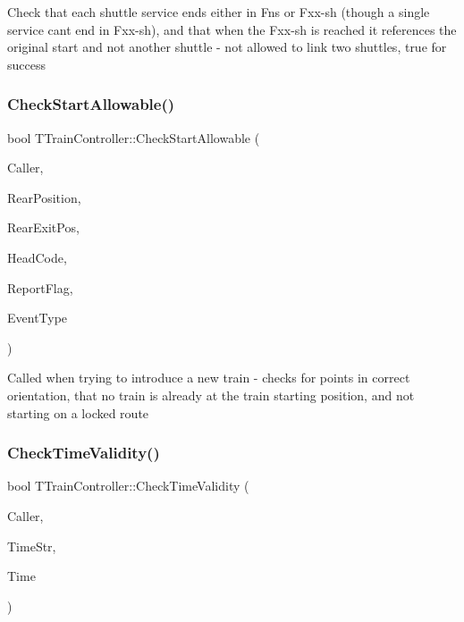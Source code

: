 Check that each shuttle service ends either in Fns or Fxx-\/sh (though a single service can\textquotesingle{}t end in Fxx-\/sh), and that when the Fxx-\/sh is reached it references the original start and not another shuttle -\/ not allowed to link two shuttles, true for success \mbox{\label{class_t_train_controller_ab8d8cf015d4784f12585f0ead325e9bf}} 
\subsubsection{\texorpdfstring{Check\+Start\+Allowable()}{CheckStartAllowable()}}
{\footnotesize\ttfamily bool T\+Train\+Controller\+::\+Check\+Start\+Allowable (\begin{DoxyParamCaption}\item[{int}]{Caller,  }\item[{int}]{Rear\+Position,  }\item[{int}]{Rear\+Exit\+Pos,  }\item[{Ansi\+String}]{Head\+Code,  }\item[{bool}]{Report\+Flag,  }\item[{T\+Action\+Event\+Type \&}]{Event\+Type }\end{DoxyParamCaption})}

Called when trying to introduce a new train -\/ checks for points in correct orientation, that no train is already at the train starting position, and not starting on a locked route \mbox{\label{class_t_train_controller_a523077cf0c9c02c8cb56dab0af9b0e52}} 
\subsubsection{\texorpdfstring{Check\+Time\+Validity()}{CheckTimeValidity()}}
{\footnotesize\ttfamily bool T\+Train\+Controller\+::\+Check\+Time\+Validity (\begin{DoxyParamCaption}\item[{int}]{Caller,  }\item[{Ansi\+String}]{Time\+Str,  }\item[{T\+Date\+Time \&}]{Time }\end{DoxyParamCaption})}

